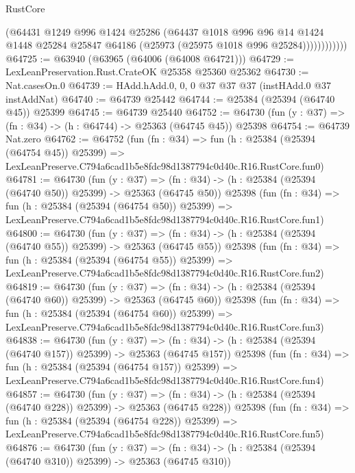 \begin{lexlean}{RustCore}
\begin{coremodule}
                    (@64431
                      @1249
                      @996
                      @1424
                      @25286
                      (@64437
                        @1018
                        @996
                        @96
                        @14
                        @1424
                        @1448
                        @25284
                        @25847
                        @64186
                        (@25973 (@25975 @1018 @996 @25284))))))))))))
@64725 := @63940 (@63965 (@64006 (@64008 @64721)))
@64729 := LexLeanPreservation.Rust.CrateOK @25358 @25360 @25362
@64730 := Nat.casesOn.{0}
@64739 := HAdd.hAdd.{0, 0, 0} @37 @37 @37 (instHAdd.{0} @37 instAddNat)
@64740 := @64739 @25442
@64744 := @25384 (@25394 (@64740 @45)) @25399
@64745 := @64739 @25440
@64752 := @64730 (fun (y : @37) => (fn : @34) -> (h : @64744) -> @25363 (@64745 @45)) @25398
@64754 := @64739 Nat.zero
@64762 := @64752
    (fun (fn : @34) =>
    fun (h : @25384 (@25394 (@64754 @45)) @25399) =>
    LexLeanPreserve.C794a6cad1b5e8fdc98d1387794c0d40c.R16.RustCore.fun0)
@64781 := @64730
    (fun (y : @37) =>
    (fn : @34) -> (h : @25384 (@25394 (@64740 @50)) @25399) -> @25363 (@64745 @50))
    @25398
    (fun (fn : @34) =>
    fun (h : @25384 (@25394 (@64754 @50)) @25399) =>
    LexLeanPreserve.C794a6cad1b5e8fdc98d1387794c0d40c.R16.RustCore.fun1)
@64800 := @64730
    (fun (y : @37) =>
    (fn : @34) -> (h : @25384 (@25394 (@64740 @55)) @25399) -> @25363 (@64745 @55))
    @25398
    (fun (fn : @34) =>
    fun (h : @25384 (@25394 (@64754 @55)) @25399) =>
    LexLeanPreserve.C794a6cad1b5e8fdc98d1387794c0d40c.R16.RustCore.fun2)
@64819 := @64730
    (fun (y : @37) =>
    (fn : @34) -> (h : @25384 (@25394 (@64740 @60)) @25399) -> @25363 (@64745 @60))
    @25398
    (fun (fn : @34) =>
    fun (h : @25384 (@25394 (@64754 @60)) @25399) =>
    LexLeanPreserve.C794a6cad1b5e8fdc98d1387794c0d40c.R16.RustCore.fun3)
@64838 := @64730
    (fun (y : @37) =>
    (fn : @34) -> (h : @25384 (@25394 (@64740 @157)) @25399) -> @25363 (@64745 @157))
    @25398
    (fun (fn : @34) =>
    fun (h : @25384 (@25394 (@64754 @157)) @25399) =>
    LexLeanPreserve.C794a6cad1b5e8fdc98d1387794c0d40c.R16.RustCore.fun4)
@64857 := @64730
    (fun (y : @37) =>
    (fn : @34) -> (h : @25384 (@25394 (@64740 @228)) @25399) -> @25363 (@64745 @228))
    @25398
    (fun (fn : @34) =>
    fun (h : @25384 (@25394 (@64754 @228)) @25399) =>
    LexLeanPreserve.C794a6cad1b5e8fdc98d1387794c0d40c.R16.RustCore.fun5)
@64876 := @64730
    (fun (y : @37) =>
    (fn : @34) -> (h : @25384 (@25394 (@64740 @310)) @25399) -> @25363 (@64745 @310))

\end{coremodule}
\end{lexlean}

